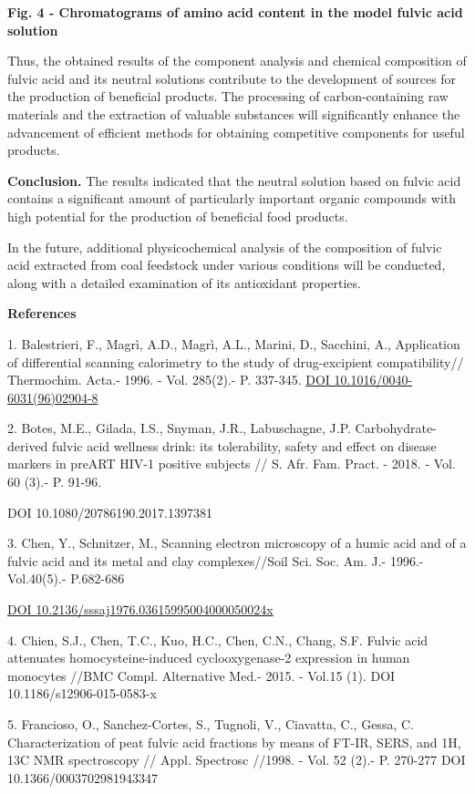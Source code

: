 {\bfseries Fig. 4 - Chromatograms of amino acid content in the model fulvic
acid solution}

Thus, the obtained results of the component analysis and chemical
composition of fulvic acid and its neutral solutions contribute to the
development of sources for the production of beneficial products. The
processing of carbon-containing raw materials and the extraction of
valuable substances will significantly enhance the advancement of
efficient methods for obtaining competitive components for useful
products.

{\bfseries Conclusion.} The results indicated that the neutral solution
based on fulvic acid contains a significant amount of particularly
important organic compounds with high potential for the production of
beneficial food products.

In the future, additional physicochemical analysis of the composition of
fulvic acid extracted from coal feedstock under various conditions will
be conducted, along with a detailed examination of its antioxidant
properties.

{\bfseries References}

1. Balestrieri, F., Magrì, A.D., Magrì, A.L., Marini, D., Sacchini, A.,
Application of differential scanning calorimetry to the study of
drug-excipient compatibility// Thermochim. Acta.- 1996. - Vol. 285(2).-
P. 337-345. \href{https://doi.org/10.1016/0040-6031(96)02904-8}{DOI
10.1016/0040-6031(96)02904-8}

2. Botes, M.E., Gilada, I.S., Snyman, J.R., Labuschagne, J.P.
Carbohydrate-derived fulvic acid wellness drink: its tolerability,
safety and effect on disease markers in preART HIV-1 positive subjects
// S. Afr. Fam. Pract. - 2018. - Vol. 60 (3).- P. 91-96.

DOI 10.1080/20786190.2017.1397381

3. Chen, Y., Schnitzer, M., Scanning electron microscopy of a humic acid
and of a fulvic acid and its metal and clay complexes//Soil Sci. Soc.
Am. J.- 1996.-Vol.40(5).- P.682-686

\href{https://doi.org/10.2136/sssaj1976.03615995004000050024x}{DOI
10.2136/sssaj1976.03615995004000050024x}

4. Chien, S.J., Chen, T.C., Kuo, H.C., Chen, C.N., Chang, S.F. Fulvic
acid attenuates homocysteine-induced cyclooxygenase-2 expression in
human monocytes //BMC Compl. Alternative Med.- 2015. - Vol.15 (1). DOI
10.1186/s12906-015-0583-x

5. Francioso, O., Sanchez-Cortes, S., Tugnoli, V., Ciavatta, C., Gessa,
C. Characterization of peat fulvic acid fractions by means of FT-IR,
SERS, and 1H, 13C NMR spectroscopy // Appl. Spectrosc //1998. - Vol. 52
(2).- P. 270-277 DOI 10.1366/0003702981943347

